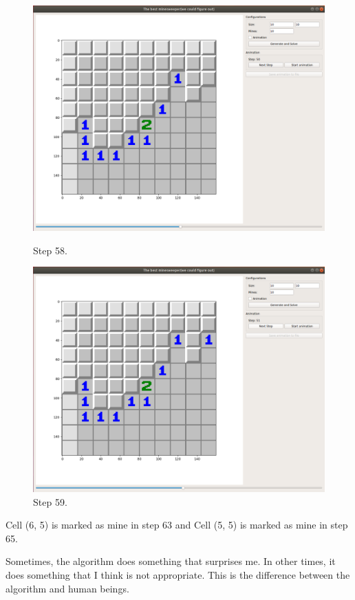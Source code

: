 \documentclass[letter]{article}
\begin{document}
\begin{enumerate}
	\begin{figure}[H]
		\includegraphics[width=\textwidth]{../pics/7.png}
		\caption{\label{fig:9}Step 58.}
		\endminipage\hfill
		\includegraphics[width=\textwidth]{../pics/8.png}
		\caption{\label{fig:10}Step 59.}
		\endminipage
	\end{figure}
	Cell (6, 5) is marked as mine in step 63 and Cell (5, 5) is marked as mine in step 65.
	
	Sometimes, the algorithm does something that surprises me. In other times, it does something that I think is not appropriate. This is the difference between the algorithm and human beings.
	

\end{enumerate}
\end{document}
